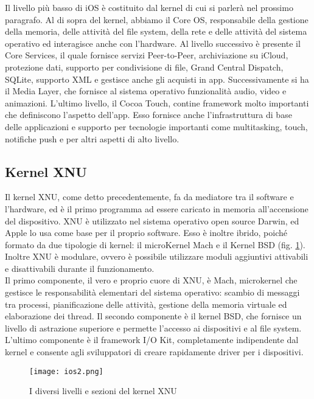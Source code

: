 Il livello più basso di iOS è costituito dal kernel di cui si parlerà nel
prossimo paragrafo. Al di sopra del kernel, abbiamo il Core OS,
responsabile della gestione della memoria, delle attività del file system, della
rete e delle attività del sistema operativo ed interagisce anche con l’hardware.
Al livello successivo è presente il Core Services, il quale fornisce servizi Peer-to-Peer,
archiviazione su iCloud, protezione dati, supporto per condivisione di file, Grand
Central Dispatch, SQLite, supporto XML e gestisce anche gli acquisti in app. Successivamente
si ha il Media Layer, che fornisce al sistema operativo funzionalità audio, video
e animazioni. L’ultimo livello, il Cocoa Touch, contine framework molto importanti
che definiscono l’aspetto dell’app. Esso fornisce anche l'infrastruttura di base delle
applicazioni e supporto per tecnologie importanti come multitasking, touch,
notifiche push e per altri aspetti di alto livello.

\subsection{Kernel XNU}
Il kernel XNU, come detto precedentemente, fa da mediatore tra il software
e l’hardware, ed è il primo programma ad essere caricato in memoria
all’accensione del dispositivo. XNU è utilizzato nel sistema operativo open source
Darwin, ed Apple lo usa come base per il proprio software. Esso è inoltre
ibrido, poiché formato da due tipologie di kernel: il microKernel Mach e il
Kernel BSD (fig. \ref{ios2}).
Inoltre XNU è modulare, ovvero è possibile utilizzare moduli aggiuntivi
attivabili e disattivabili durante il funzionamento. \\
Il primo componente, il vero e proprio cuore di XNU, è Mach, microkernel che gestisce le
responsabilità elementari del sistema operativo: scambio di messaggi tra
processi, pianificazione delle attività, gestione della memoria virtuale ed
elaborazione dei thread. Il secondo componente è il kernel BSD, che fornisce un
livello di astrazione superiore e permette l’accesso ai dispositivi e al file
system. L’ultimo componente è il framework I/O Kit, completamente indipendente
dal kernel e consente agli sviluppatori di creare rapidamente driver per i
dispositivi. \\
\begin{figure}[!h]
    \centering
    \texttt{[image: ios2.png]}
    \caption{I diversi livelli e sezioni del kernel XNU}
    \label{ios2}
\end{figure}


